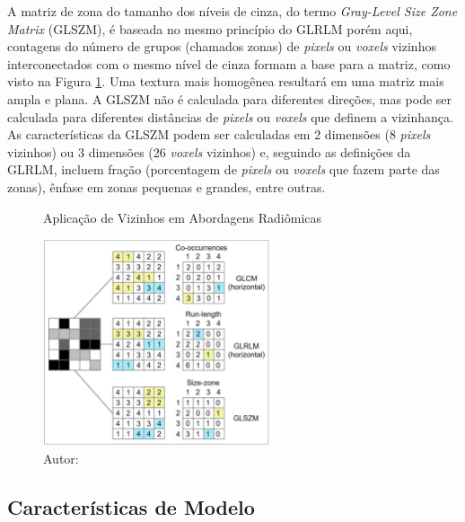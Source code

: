 A matriz de zona do tamanho dos níveis de cinza, do termo \textit{Gray-Level Size Zone Matrix} (GLSZM), é baseada no mesmo princípio do GLRLM porém aqui, contagens do número de grupos (chamados zonas) de \textit{pixels} ou \textit{voxels} vizinhos interconectados com o mesmo nível de cinza formam a base para a matriz, como visto na Figura \ref{fig:fig002}. Uma textura mais homogênea resultará em uma matriz mais ampla e plana. A GLSZM não é calculada para diferentes direções, mas pode ser calculada para diferentes distâncias de \textit{pixels} ou \textit{voxels} que definem a vizinhança. As características da GLSZM podem ser calculadas em 2 dimensões (8 \textit{pixels} vizinhos) ou 3 dimensões (26 \textit{voxels} vizinhos) e, seguindo as definições da GLRLM, incluem fração (porcentagem de \textit{pixels} ou \textit{voxels} que fazem parte das zonas), ênfase em zonas pequenas e grandes, entre outras.

\begin{figure}[htbp]
    \centering
    \caption{Aplicação de Vizinhos em Abordagens Radiômicas}
    \includegraphics[width=0.6\textwidth]{figures/fig002.png}
    \caption*{Autor: \cite{mayerhoeferIntroductionRadiomics2020}}
    \label{fig:fig002}
\end{figure}

\subsection{Características de Modelo}

